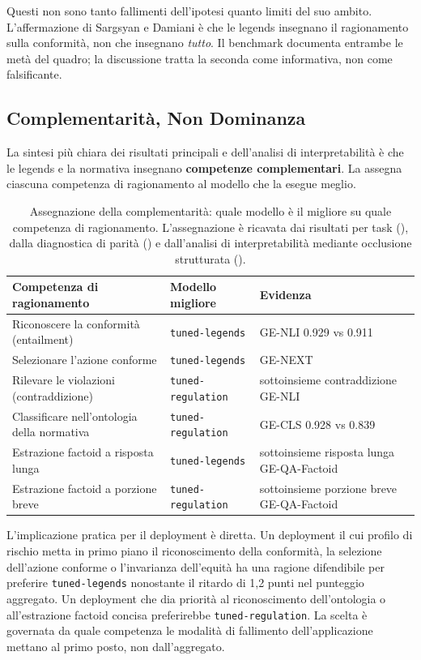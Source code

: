\documentclass[pdflatex, sn-apa]{sn-jnl}%
\theoremstyle{thmstyleone}%
\theoremstyle{thmstyletwo}%
\theoremstyle{thmstylethree}%
\newcommand{\modellegends}{\texttt{tuned-legends}}
\newcommand{\modelreg}{\texttt{tuned-regulation}}
\begin{document}
Questi non sono tanto fallimenti dell'ipotesi quanto limiti del suo ambito.
L'affermazione di Sargsyan e Damiani è che le legends insegnano il ragionamento
sulla conformità, non che insegnano \emph{tutto}. Il benchmark documenta entrambe
le metà del quadro; la discussione tratta la seconda come informativa, non come
falsificante.

\subsection{Complementarità, Non Dominanza}
\label{sec:disc:complementarity}

La sintesi più chiara dei risultati principali e dell'analisi di interpretabilità è
che le legends e la normativa insegnano \textbf{competenze complementari}. La
 assegna ciascuna competenza di ragionamento al modello
che la esegue meglio.

\begin{table}[h]
\centering
\caption{Assegnazione della complementarità: quale modello è il migliore su quale
competenza di ragionamento. L'assegnazione è ricavata dai risultati per task
(), dalla
diagnostica di parità () e dall'analisi di interpretabilità
mediante occlusione strutturata ().}
\label{tab:complementarity}
\small
\begin{tabular}{@{}lll@{}}
\toprule
Competenza di ragionamento                    & Modello migliore   & Evidenza \\
\midrule
Riconoscere la conformità (entailment)        & \modellegends      & GE-NLI
0.929 vs 0.911 \\
Selezionare l'azione conforme                 & \modellegends      & GE-NEXT \\
Rilevare le violazioni (contraddizione)       & \modelreg          & sottoinsieme
contraddizione GE-NLI \\
Classificare nell'ontologia della normativa   & \modelreg          & GE-CLS
0.928 vs 0.839 \\
Estrazione factoid a risposta lunga           & \modellegends      &
sottoinsieme risposta lunga GE-QA-Factoid \\
Estrazione factoid a porzione breve           & \modelreg          &
sottoinsieme porzione breve GE-QA-Factoid \\
\bottomrule
\end{tabular}
\end{table}

L'implicazione pratica per il deployment è diretta. Un deployment il cui profilo di
rischio metta in primo piano il riconoscimento della conformità, la selezione
dell'azione conforme o l'invarianza dell'equità ha una ragione difendibile per
preferire \modellegends{} nonostante il ritardo di 1,2 punti nel punteggio
aggregato. Un deployment che dia priorità al riconoscimento dell'ontologia o
all'estrazione factoid concisa preferirebbe \modelreg. La scelta è governata da
quale competenza le modalità di fallimento dell'applicazione mettano al primo posto,
non dall'aggregato.
\end{document}
